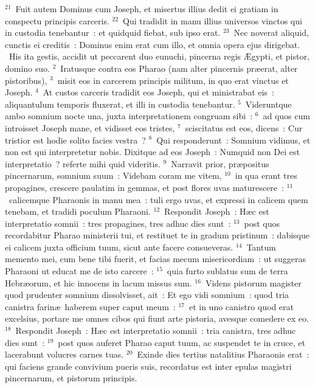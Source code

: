 ${}^{21}$~Fuit autem Dominus cum Joseph, et misertus illius dedit ei gratiam in conspectu principis carceris.
${}^{22}$~Qui tradidit in manu illius universos vinctos qui in custodia tenebantur~: et quidquid fiebat, sub ipso erat.
${}^{23}$~Nec noverat aliquid, cunctis ei creditis~: Dominus enim erat cum illo, et omnia opera ejus dirigebat.
~His ita gestis, accidit ut peccarent duo eunuchi, pincerna regis \AE gypti, et pistor, domino suo.
${}^{2}$~Iratusque contra eos Pharao (nam alter pincernis pr\ae erat, alter pistoribus),
${}^{3}$~misit eos in carcerem principis militum, in quo erat vinctus et Joseph.
${}^{4}$~At custos carceris tradidit eos Joseph, qui et ministrabat eis~: aliquantulum temporis fluxerat, et illi in custodia tenebantur.
${}^{5}$~Videruntque ambo somnium nocte una, juxta interpretationem congruam sibi~:
${}^{6}$~ad quos cum introisset Joseph mane, et vidisset eos tristes,
${}^{7}$~sciscitatus est eos, dicens~: Cur tristior est hodie solito facies vestra~?
${}^{8}$~Qui responderunt~: Somnium vidimus, et non est qui interpretetur nobis. Dixitque ad eos Joseph~: Numquid non Dei est interpretatio~? referte mihi quid videritis.
${}^{9}$~Narravit prior, pr\ae positus pincernarum, somnium suum~: Videbam coram me vitem,
${}^{10}$~in qua erant tres propagines, crescere paulatim in gemmas, et post flores uvas maturescere~:
${}^{11}$~calicemque Pharaonis in manu mea~: tuli ergo uvas, et expressi in calicem quem tenebam, et tradidi poculum Pharaoni.
${}^{12}$~Respondit Joseph~: H\ae c est interpretatio somnii~: tres propagines, tres adhuc dies sunt~:
${}^{13}$~post quos recordabitur Pharao ministerii tui, et restituet te in gradum pristinum~: dabisque ei calicem juxta officium tuum, sicut ante facere consueveras.
${}^{14}$~Tantum memento mei, cum bene tibi fuerit, et facias mecum misericordiam~: ut suggeras Pharaoni ut educat me de isto carcere~:
${}^{15}$~quia furto sublatus sum de terra Hebr\ae orum, et hic innocens in lacum missus sum.
${}^{16}$~Videns pistorum magister quod prudenter somnium dissolvisset, ait~: Et ego vidi somnium~: quod tria canistra farin\ae\ haberem super caput meum~:
${}^{17}$~et in uno canistro quod erat excelsius, portare me omnes cibos qui fiunt arte pistoria, avesque comedere ex eo.
${}^{18}$~Respondit Joseph~: H\ae c est interpretatio somnii~: tria canistra, tres adhuc dies sunt~:
${}^{19}$~post quos auferet Pharao caput tuum, ac suspendet te in cruce, et lacerabunt volucres carnes tuas.
${}^{20}$~Exinde dies tertius natalitius Pharaonis erat~: qui faciens grande convivium pueris suis, recordatus est inter epulas magistri pincernarum, et pistorum principis.
